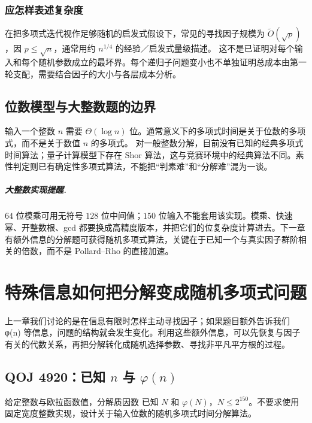 \documentclass[UTF8,a4paper,11pt,twoside,openright,fontset=fandol]{ctexbook}
\theoremstyle{definition}
\begin{document}
\subsection{应怎样表述复杂度}
在把多项式迭代视作足够随机的启发式假设下，常见的寻找因子规模为 $\widetilde O(\sqrt p)$，因 $p\le\sqrt n$，通常用约 $n^{1/4}$ 的经验／启发式量级描述。
这不是已证明对每个输入和每个随机参数成立的最坏界。每个递归子问题变小也不单独证明总成本由第一轮支配，需要结合因子的大小与各层成本分析。

\section{位数模型与大整数题的边界}
输入一个整数 $n$ 需要 $\Theta(\log n)$ 位。通常意义下的多项式时间是关于位数的多项式，而不是关于数值 $n$ 的多项式。
对一般整数分解，目前没有已知的经典多项式时间算法；量子计算模型下存在 Shor 算法，这与竞赛环境中的经典算法不同。素性判定则已有确定性多项式算法，不能把“判素难”和“分解难”混为一谈。

\paragraph{大整数实现提醒.} $64$ 位模乘可用无符号 $128$ 位中间值；$150$ 位输入不能套用该实现。模乘、快速幂、开整数根、gcd 都要换成高精度版本，并把它们的位复杂度计算进去。下一章有额外信息的分解题可获得随机多项式算法，关键在于已知一个与真实因子群阶相关的倍数，而不是 Pollard--Rho 的直接加速。



\chapter{特殊信息如何把分解变成随机多项式问题}
\begin{chapterintro}[章节导读]
上一章我们讨论的是在信息有限时怎样主动寻找因子；如果题目额外告诉我们 φ(n) 等信息，问题的结构就会发生变化。利用这些额外信息，可以先恢复与因子有关的代数关系，再把分解转化成随机选择参数、寻找非平凡平方根的过程。
\end{chapterintro}

\section{QOJ 4920：已知 \texorpdfstring{$n$}{n} 与 \texorpdfstring{$\varphi(n)$}{phi(n)}}
\begin{problem}{给定整数与欧拉函数值，分解质因数}
已知 $N$ 和 $\varphi(N)$，$N\le2^{150}$。不要求使用固定宽度整数实现，设计关于输入位数的随机多项式时间分解算法。
\end{problem}
\end{document}
